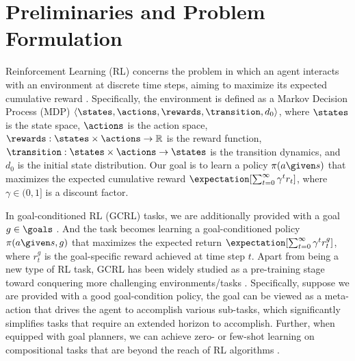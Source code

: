 \documentclass[11pt, a4paper, logo, one column]{craftjarvis}
\begin{document}



\section{Preliminaries and Problem Formulation}
\label{sec:preliminaries}

Reinforcement Learning (RL) concerns the problem in which an agent interacts with an environment at discrete time steps, aiming to maximize its expected cumulative reward \citep{dqn, ppo, impala}. Specifically, the environment is defined as a Markov Decision Process (MDP) $\langle \states, \actions, \rewards, \transition, d_0 \rangle$, where $\states$ is the state space, $\actions$ is the action space, $\rewards: \states \times \actions \rightarrow \mathbb{R}$ is the reward function, $\transition: \states \times \actions \rightarrow \states$ is the transition dynamics, and $d_0$ is the initial state distribution. Our goal is to learn a policy $\pi (a \given s)$ that maximizes the expected cumulative reward $\expectation [ \sum_{t=0}^{\infty} \gamma^t r_t ]$, where $\gamma \in (0, 1]$ is a discount factor.

In goal-conditioned RL (GCRL) tasks, we are additionally provided with a goal $g \in \goals$ \citep{her,gcil,gcrl,worldmc,jxma1,jxma2,jxma3}. And the task becomes learning a goal-conditioned policy $\pi (a \given s, g)$ that maximizes the expected return $\expectation [ \sum_{t=0}^{\infty} \gamma^t r_t^g ]$, where $r_t^g$ is the goal-specific reward achieved at time step $t$. Apart from being a new type of RL task, GCRL has been widely studied as a pre-training stage toward conquering more challenging environments/tasks \citep{hardplay, vpt, eccvpt}. Specifically, suppose we are provided with a good goal-condition policy, the goal can be viewed as a meta-action that drives the agent to accomplish various sub-tasks, which significantly simplifies tasks that require an extended horizon to accomplish. Further, when equipped with goal planners, we can achieve zero- or few-shot learning on compositional tasks that are beyond the reach of RL algorithms \citep{inner, deps, voyager,gitm,jxma4}.
\end{document}

